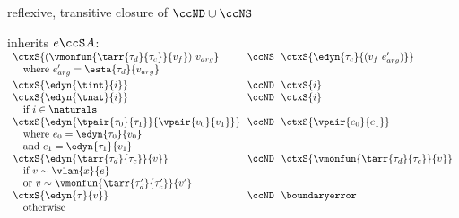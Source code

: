 \begin{flushleft}
\begin{minipage}[t]{\columnwidth}
 reflexive, transitive closure of $\ccND \cup \ccNS$
\end{minipage}%
\begin{minipage}[t]{\columnwidth}
 inherits $e \ccS A$:\\
$\begin{array}{l@{~~}c@{~~}l}
  \ctxS{(\vmonfun{\tarr{\tau_d}{\tau_c}}{v_f})~v_{arg}} & \ccNS & \ctxS{\edyn{\tau_c}{(v_f~e_{arg}')}}
\\ \multicolumn{3}{l}{\mbox{\quad where $e_{arg}' = \esta{\tau_d}{v_{arg}}$}}
\\[0.8ex]
  \ctxS{\edyn{\tint}{i}} & \ccND & \ctxS{i}
\\
  \ctxS{\edyn{\tnat}{i}} & \ccND & \ctxS{i}
\\ \multicolumn{3}{l}{\mbox{\quad if $i \in \naturals$}}
\\
  \ctxS{\edyn{\tpair{\tau_0}{\tau_1}}{\vpair{v_0}{v_1}}} & \ccND & \ctxS{\vpair{e_0}{e_1}}
\\ \multicolumn{3}{l}{\mbox{\quad where $e_0 = \edyn{\tau_0}{v_0}$}}
\\ \multicolumn{3}{l}{\mbox{\quad and $e_1 = \edyn{\tau_1}{v_1}$}}
\\
  \ctxS{\edyn{\tarr{\tau_d}{\tau_c}}{v}} & \ccND & \ctxS{\vmonfun{\tarr{\tau_d}{\tau_c}}{v}}
\\ \multicolumn{3}{l}{\mbox{\quad if $v \sim \vlam{x}{e}$}}
\\ \multicolumn{3}{l}{\mbox{\quad or $v \sim \vmonfun{\tarr{\tau_d'}{\tau_c'}}{v'}$}}
\\
  \ctxS{\edyn{\tau}{v}} & \ccND & \boundaryerror
\\ \multicolumn{3}{l}{\mbox{\quad otherwise}}
\end{array}$
\end{minipage}

\end{flushleft}
